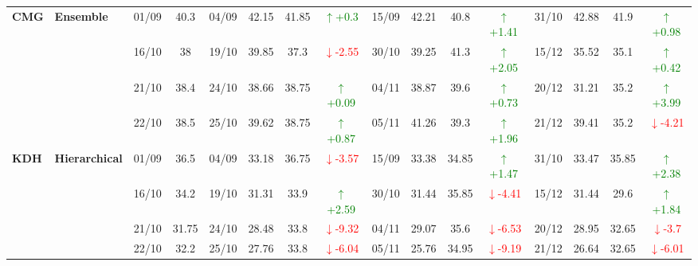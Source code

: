 \documentclass{ieeeaccess}
\begin{document}
{\begin{longtable}{llcc|cccc|cccc|cccc}
\multirow{4}{*}{\textbf{CMG}} 
& \textbf{Ensemble}
& 01/09 & 40.3 & 04/09 & 42.15 & 41.85 & \textcolor{green}{\(\uparrow\)+0.3} & 15/09 & 42.21 & 40.8 & \textcolor{green}{\(\uparrow\)+1.41} & 31/10 & 42.88 & 41.9 & \textcolor{green}{\(\uparrow\)+0.98} \\

& 
& 16/10 & 38 & 19/10 & 39.85 & 37.3 & \textcolor{red}{\(\downarrow\)-2.55} & 30/10 & 39.25 & 41.3 & \textcolor{green}{\(\uparrow\)+2.05} & 15/12 & 35.52 & 35.1 & \textcolor{green}{\(\uparrow\)+0.42} \\

& 
& 21/10 & 38.4 & 24/10 & 38.66 & 38.75 & \textcolor{green}{\(\uparrow\)+0.09} & 04/11 & 38.87 & 39.6 & \textcolor{green}{\(\uparrow\)+0.73} & 20/12 & 31.21 & 35.2 & \textcolor{green}{\(\uparrow\)+3.99} \\

&
& 22/10 & 38.5 & 25/10 & 39.62 & 38.75 & \textcolor{green}{\(\uparrow\)+0.87} & 05/11 & 41.26 & 39.3 & \textcolor{green}{\(\uparrow\)+1.96} & 21/12 & 39.41 & 35.2 & \textcolor{red}{\(\downarrow\)-4.21} \\
\midrule



\multirow{4}{*}{\textbf{KDH}} 
& \textbf{Hierarchical}
& 01/09 & 36.5 & 04/09 & 33.18 & 36.75 & \textcolor{red}{\(\downarrow\)-3.57} & 15/09 & 33.38 & 34.85 & \textcolor{green}{\(\uparrow\)+1.47} & 31/10 & 33.47 & 35.85 & \textcolor{green}{\(\uparrow\)+2.38} \\

&
& 16/10 & 34.2 & 19/10 & 31.31 & 33.9 & \textcolor{green}{\(\uparrow\)+2.59} & 30/10 & 31.44 & 35.85 & \textcolor{red}{\(\downarrow\)-4.41} & 15/12 & 31.44 & 29.6 & \textcolor{green}{\(\uparrow\)+1.84} \\

&
& 21/10 & 31.75 & 24/10 & 28.48 & 33.8 & \textcolor{red}{\(\downarrow\)-9.32} & 04/11 & 29.07 & 35.6 & \textcolor{red}{\(\downarrow\)-6.53} & 20/12 & 28.95 & 32.65 &\textcolor{red}{\(\downarrow\)-3.7}\\

&
& 22/10 & 32.2 & 25/10 & 27.76 & 33.8 & \textcolor{red}{\(\downarrow\)-6.04} & 05/11 & 25.76 & 34.95 & \textcolor{red}{\(\downarrow\)-9.19} & 21/12 & 26.64 & 32.65 & \textcolor{red}{\(\downarrow\)-6.01} \\
\midrule



\end{longtable}}
\end{document}
